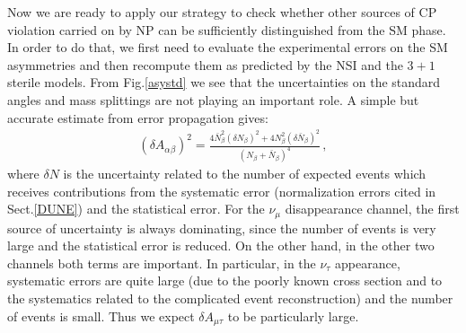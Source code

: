 \documentclass[12pt]{article}
\begin{document}
Now we are ready to apply our strategy to check whether other sources of CP violation carried on by NP can be sufficiently distinguished from the SM phase. In order to do that, we first need to evaluate the experimental errors on the SM asymmetries and then recompute them as predicted by the NSI and the $3+1$ sterile models.
From Fig.\ref{asystd} we see that the uncertainties on the standard angles and mass splittings are not playing an important role. 
A simple but accurate estimate from error propagation gives:
\begin{eqnarray}
 (\delta A_{\alpha\beta})^2=\frac{4\bar N_\beta^2 (\delta N_\beta)^2+4N_\beta^2 (\delta \bar N_\beta)^2}{(N_\beta+\bar N_\beta)^4}\,,\label{asyerror}
\end{eqnarray}
where $\delta N$ is the uncertainty related to the number of expected events which receives contributions from the systematic error (normalization errors cited in Sect.\ref{DUNE}) and the statistical error. For the $\nu_\mu$ disappearance channel, the first source of uncertainty is always dominating, since the number of events is very large and the statistical error is reduced. On the other hand, in the other two channels both terms are important. In particular, in the $\nu_\tau$ appearance, systematic errors are quite large (due to the poorly known cross section and to the systematics related to the complicated event reconstruction) and the number of events is small. Thus we expect  $\delta A_{\mu\tau}$ to be particularly large. 
\end{document}
